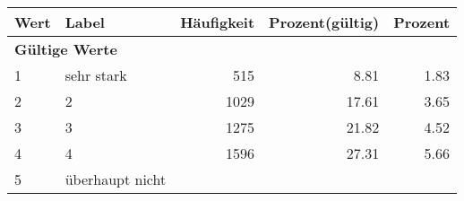      \begin{longtable}{lXrrr}
     \toprule
     \textbf{Wert} & \textbf{Label} & \textbf{Häufigkeit} & \textbf{Prozent(gültig)} & \textbf{Prozent} \\
     \endhead
     \midrule
     \multicolumn{5}{l}{\textbf{Gültige Werte}}\\

     1 &
     \multicolumn{1}{X}{ sehr stark   } &


       \num{515} &
       \num[round-mode=places,round-precision=2]{8.81} &
         \num[round-mode=places,round-precision=2]{1.83} \\

     2 &
     \multicolumn{1}{X}{ 2   } &


       \num{1029} &
       \num[round-mode=places,round-precision=2]{17.61} &
         \num[round-mode=places,round-precision=2]{3.65} \\

     3 &
     \multicolumn{1}{X}{ 3   } &


       \num{1275} &
       \num[round-mode=places,round-precision=2]{21.82} &
         \num[round-mode=places,round-precision=2]{4.52} \\

     4 &
     \multicolumn{1}{X}{ 4   } &


       \num{1596} &
       \num[round-mode=places,round-precision=2]{27.31} &
         \num[round-mode=places,round-precision=2]{5.66} \\

     5 &
     \multicolumn{1}{X}{ überhaupt nicht   } &



\end{longtable}
